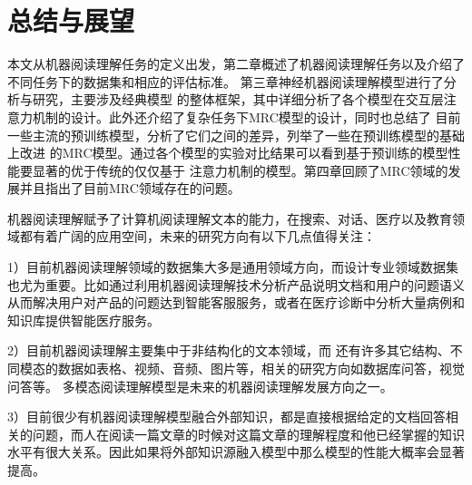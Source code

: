 \documentclass{article}
\begin{document}
\section{总结与展望}
本文从机器阅读理解任务的定义出发，第二章概述了机器阅读理解任务以及介绍了不同任务下的数据集和相应的评估标准。
第三章神经机器阅读理解模型进行了分析与研究，主要涉及经典模型
的整体框架，其中详细分析了各个模型在交互层注意力机制的设计。此外还介绍了复杂任务下MRC模型的设计，同时也总结了
目前一些主流的预训练模型，分析了它们之间的差异，列举了一些在预训练模型的基础上改进
的MRC模型。通过各个模型的实验对比结果可以看到基于预训练的模型性能要显著的优于传统的仅仅基于
注意力机制的模型。第四章回顾了MRC领域的发展并且指出了目前MRC领域存在的问题。

机器阅读理解赋予了计算机阅读理解文本的能力，在搜索、对话、医疗以及教育领域都有着广阔的应用空间，未来的研究方向有以下几点值得关注：

1）目前机器阅读理解领域的数据集大多是通用领域方向，而设计专业领域数据集也尤为重要。比如通过利用机器阅读理解技术分析产品说明文档和用户的问题语义从而解决用户对产品的问题达到智能客服服务，或者在医疗诊断中分析大量病例和知识库提供智能医疗服务。


2）目前机器阅读理解主要集中于非结构化的文本领域，而
还有许多其它结构、不同模态的数据如表格、视频、音频、图片等，相关的研究方向如数据库问答，视觉问答等。
多模态阅读理解模型是未来的机器阅读理解发展方向之一。

3）目前很少有机器阅读理解模型融合外部知识，都是直接根据给定的文档回答相关的问题，而人在阅读一篇文章的时候对这篇文章的理解程度和他已经掌握的知识水平有很大关系。因此如果将外部知识源融入模型中那么模型的性能大概率会显著提高。




\printbibliography[title={参考文献}]
\end{document}
